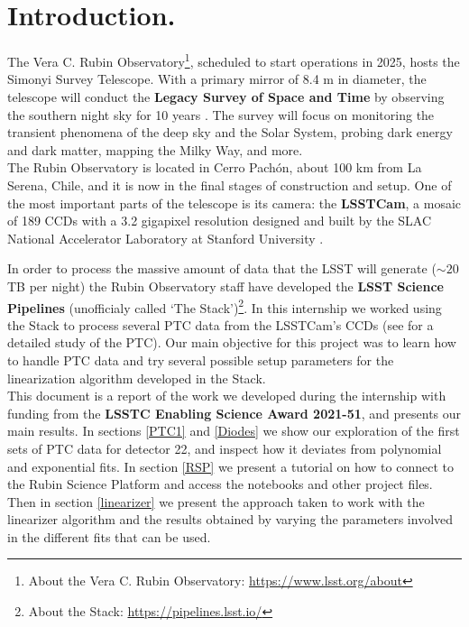 \section{Introduction.}

\noindent The Vera C. Rubin Observatory\footnote{About the Vera C. Rubin Observatory: \url{https://www.lsst.org/about}}, scheduled to start operations in 2025, hosts the Simonyi Survey Telescope. With a primary mirror of 8.4 m in diameter, the telescope will conduct the \textbf{Legacy Survey of Space and Time} by observing the southern night sky for 10 years \citep{2019ApJ...873..111I}. The survey will focus on monitoring the transient phenomena of the deep sky and the Solar System, probing dark energy and dark matter, mapping the Milky Way, and more.\\

\noindent The Rubin Observatory is located in Cerro Pachón, about 100 km from La Serena, Chile, and it is now in the final stages of construction and setup. One of the most important parts of the telescope is its camera: the \textbf{LSSTCam}, a mosaic of 189 CCDs with a 3.2 gigapixel resolution designed and built by the SLAC National Accelerator Laboratory at Stanford University \citep{10.71929/rubin/2571927}.

\noindent In order to process the massive amount of data that the LSST will generate ($\sim 20$ TB per night) the Rubin Observatory staff have developed the \textbf{LSST Science Pipelines}  (unofficialy called `The Stack')\footnote{About the Stack: \url{https://pipelines.lsst.io/}}. In this internship we worked using the Stack to process several PTC data from the LSSTCam's CCDs (see  for a detailed study of the PTC). Our main objective for this project was to learn how to handle PTC data and try several possible setup parameters for the linearization algorithm developed in the Stack. \\

\noindent This document is a report of the work we developed during the internship with funding from the \textbf{LSSTC Enabling Science Award 2021-51}, and presents our main results. In sections \ref{PTC1} and \ref{Diodes} we show our exploration of the first sets of PTC data for detector 22, and inspect how it deviates from polynomial and exponential fits. In section \ref{RSP} we present a tutorial on how to connect to the Rubin Science Platform  and access the notebooks and other project files. Then in section \ref{linearizer} we present the approach taken to work with the linearizer algorithm and the results obtained by varying the parameters involved in the different fits that can be used.\\

